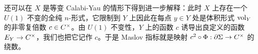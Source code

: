 还可以在 $X$ 是等变 Calabi-Yau 的情形下得到进一步解释：此时 $X$ 上存在一个 $U(1)$ 不变的全纯 $n$-形式，它限制到 $Y$ 上因此在每点 $y\in Y$ 处是体积形式 $\operatorname{vol}_Y$ 的非零复倍数 $c\in C^\times$。由 $U(1)$ 不变性，$Y$ 上的函数 $c$ 诱导出良定义的函数 $E_Y\to C^\times$，我们也把它记作 $c$。于是 Maslov 指标就是映射 $c^2\circ\Phi:\partial\Sigma\to C^\times$ 的绕数。

